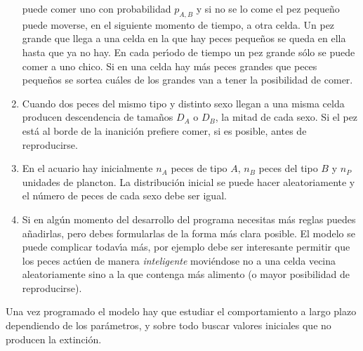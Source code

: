 \begin{ejer}
\begin{enumerate}
puede comer uno con probabilidad $p_{A,B}$ y si no se lo come el pez peque\~no 
puede moverse, en el siguiente momento de tiempo,   a otra celda. Un pez grande 
que llega a una celda en la que hay peces peque\~nos se queda en ella hasta que 
ya no hay. En cada per\'{\i}odo de tiempo un pez grande s\'olo se puede comer a 
uno chico. Si en una celda hay m\'as peces grandes que peces peque\~nos se 
sortea cu\'ales de los grandes van a tener la posibilidad de comer. 
\item Cuando dos peces del mismo tipo y distinto sexo llegan a una misma celda 
producen descendencia de tamaños $D_A$ o $D_B$, la mitad de cada sexo. Si el 
pez está al borde de la inanición prefiere comer, si es posible, antes de 
reproducirse.
\item En el acuario hay inicialmente $n_A$ peces de tipo $A$, $n_B$ peces del 
tipo $B$ y $n_P$ unidades de plancton. La distribución inicial se puede hacer 
aleatoriamente y el número de peces de cada sexo debe ser igual.
\item Si en alg\'un momento del desarrollo del programa necesitas m\'as reglas 
puedes añadirlas, pero debes formularlas de la forma m\'as clara posible. El 
modelo se puede complicar todav\'{\i}a más, por ejemplo debe ser interesante 
permitir que los peces act\'uen de manera {\itshape inteligente} moviéndose no 
a una celda vecina aleatoriamente sino a la que contenga m\'as alimento (o 
mayor posibilidad de reproducirse).
\end{enumerate}
\end{ejer}

Una vez programado el modelo hay que estudiar el comportamiento a largo plazo 
dependiendo de los par\'ametros, y sobre todo buscar valores iniciales que no 
producen la extinci\'on.

